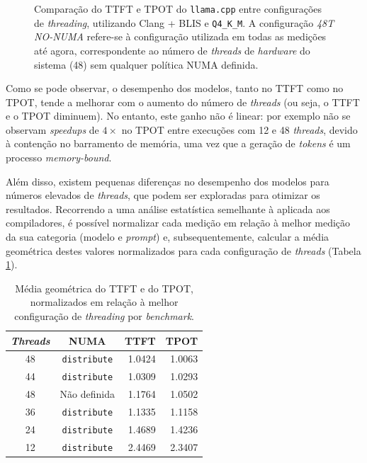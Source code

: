 \documentclass[11pt, a4paper]{article}
\begin{document}
\begin{figure}[H]
    
\end{figure}
\begin{figure}[H]
    
    \caption{
        \onehalfspacing
        Comparação do TTFT e TPOT do \texttt{llama.cpp} entre configurações de \emph{threading},
        utilizando Clang + BLIS e \texttt{Q4\_K\_M}. A configuração \textit{48T NO-NUMA} refere-se à
        configuração utilizada em todas as medições até agora, correspondente ao número de
        \emph{threads} de \emph{hardware} do sistema (48) sem qualquer política NUMA definida.
    }
    \label{threading-results}
\end{figure}

Como se pode observar, o desempenho dos modelos, tanto no TTFT como no TPOT, tende a melhorar com o
aumento do número de \emph{threads} (ou seja, o TTFT e o TPOT diminuem). No entanto, este ganho não
é linear: por exemplo não se observam \emph{speedups} de $4\times$ no TPOT entre execuções com 12 e
48 \emph{threads}, devido à contenção no barramento de memória, uma vez que a geração de
\emph{tokens} é um processo \emph{memory-bound}.

Além disso, existem pequenas diferenças no desempenho dos modelos para números elevados de
\emph{threads}, que podem ser exploradas para otimizar os resultados. Recorrendo a uma análise
estatística semelhante à aplicada aos compiladores, é possível normalizar cada medição em relação à
melhor medição da sua categoria (modelo e \emph{prompt}) e, subsequentemente, calcular a média
geométrica destes valores normalizados para cada configuração de \emph{threads} (Tabela
\ref{threading-geomean}).

\begin{table}[h]
    \centering
    \begin{tabular}{|c|c|r|r|}
        \hline
        \textbf{\emph{Threads}} & \textbf{NUMA}       & \textbf{TTFT} & \textbf{TPOT} \\ \hline
                             48 & \texttt{distribute} &        1.0424 &        1.0063 \\ \hline
                             44 & \texttt{distribute} &        1.0309 &        1.0293 \\ \hline
                             48 & Não definida        &        1.1764 &        1.0502 \\ \hline
                             36 & \texttt{distribute} &        1.1335 &        1.1158 \\ \hline
                             24 & \texttt{distribute} &        1.4689 &        1.4236 \\ \hline
                             12 & \texttt{distribute} &        2.4469 &        2.3407 \\ \hline
    \end{tabular}
    \caption{
        \onehalfspacing
        Média geométrica do TTFT e do TPOT, normalizados em relação à melhor configuração de
        \emph{threading} por \emph{benchmark}.
    }
    \label{threading-geomean}
\end{table}
\end{document}
